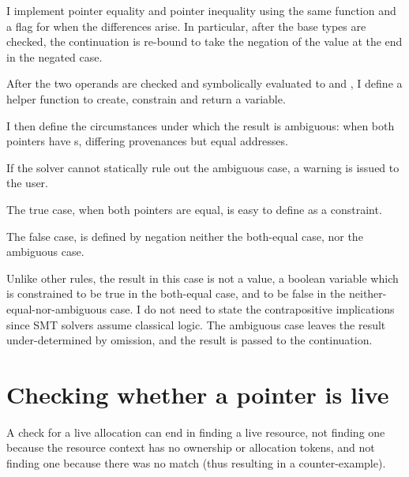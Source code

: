 I implement pointer equality and pointer inequality using the same function and
a flag for when the differences arise. In particular, after the base types are
checked, the continuation is re-bound to take the negation of the value at the
end in the negated case.


After the two operands are checked and symbolically evaluated to
 and , I define a helper function to create,
constrain and return a variable.


I then define the circumstances under which the result is ambiguous: when both
pointers have s, differing provenances but equal addresses.


If the solver cannot statically rule out the ambiguous case, a warning is
issued to the user.


The true case, when both pointers are equal, is easy to define as a constraint.


The false case, is defined by negation \textemdash{} neither the both-equal
case, nor the ambiguous case.


Unlike other rules, the result in this case is not a value, a boolean variable
which is constrained to be true in the both-equal case, and to be false in the
neither-equal-nor-ambiguous case. I do not need to state the contrapositive
implications since SMT solvers assume classical logic. The ambiguous case
leaves the result under-determined by omission, and the result is passed to the
continuation.


\section{Checking whether a pointer is live}

A check for a live allocation can end in finding a live resource, not finding
one because the resource context has no ownership or allocation tokens, and not
finding one because there was no match (thus resulting in a counter-example).

